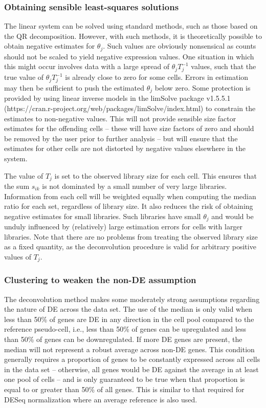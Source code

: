 \documentclass{bmcart}
\begin{document}
\subsubsection*{Obtaining sensible least-squares solutions}
The linear system can be solved using standard methods, such as those based on the QR decomposition.
However, with such methods, it is theoretically possible to obtain negative estimates for $\theta_j$.
Such values are obviously nonsensical as counts should not be scaled to yield negative expression values.
One situation in which this might occur involves data with a large spread of $\theta_jT_j^{-1}$ values, 
    such that the true value of $\theta_jT_j^{-1}$ is already close to zero for some cells.
Errors in estimation may then be sufficient to push the estimated $\theta_j$ below zero.
Some protection is provided by using linear inverse models in the limSolve package v1.5.5.1 ({https://cran.r-project.org/web/packages/limSolve/index.html}) \cite{soetaert2009limsolve} to constrain the estimates to non-negative values.
This will not provide sensible size factor estimates for the offending cells -- these will have size factors of zero and should be removed by the user prior to further analysis --
    but will ensure that the estimates for other cells are not distorted by negative values elsewhere in the system.

The value of $T_j$ is set to the observed library size for each cell.
This ensures that the sum $s_{ik}$ is not dominated by a small number of very large libraries.
Information from each cell will be weighted equally when computing the median ratio for each set, regardless of library size.
It also reduces the risk of obtaining negative estimates for small libraries.
Such libraries have small $\theta_j$ and would be unduly influenced by (relatively) large estimation errors for cells with larger libraries.
Note that there are no problems from treating the observed library size as a fixed quantity, as the deconvolution procedure is valid for arbitrary positive values of $T_j$.

\subsubsection*{Clustering to weaken the non-DE assumption}
The deconvolution method makes some moderately strong assumptions regarding the nature of DE across the data set.
The use of the median is only valid when less than 50\% of genes are DE in any direction in the cell pool compared to the reference pseudo-cell,
    i.e., less than 50\% of genes can be upregulated and less than 50\% of genes can be downregulated.
If more DE genes are present, the median will not represent a robust average across non-DE genes.
This condition generally requires a proportion of genes to be constantly expressed across all cells in the data set 
    -- otherwise, all genes would be DE against the average in at least one pool of cells -- 
    and is only guaranteed to be true when that proportion is equal to or greater than 50\% of all genes.
This is similar to that required for DESeq normalization where an average reference is also used.
\end{document}
